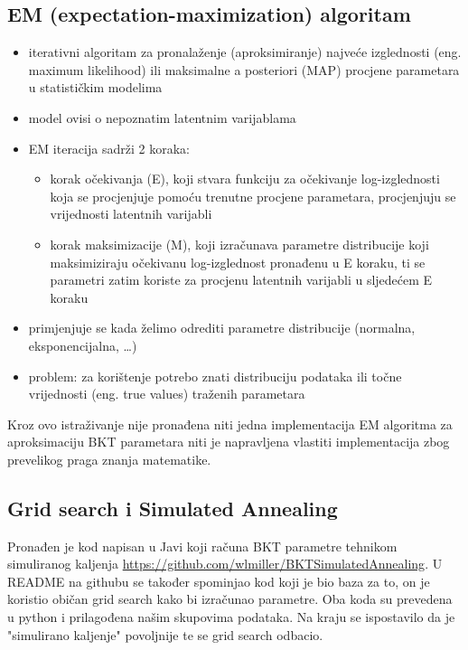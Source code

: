 \documentclass[times, utf8,projekt]{fer}
\begin{document}
\subsection{EM (expectation-maximization) algoritam}
\begin{itemize}
	\item iterativni algoritam za pronalaženje (aproksimiranje) najveće izglednosti (eng. maximum likelihood) ili maksimalne a posteriori (MAP) procjene parametara u statističkim modelima
	\item model ovisi o nepoznatim latentnim varijablama
	\item EM iteracija sadrži 2 koraka:
	\begin{itemize}
		\item 	korak očekivanja (E), koji stvara funkciju za očekivanje log-izglednosti koja se procjenjuje pomoću trenutne procjene parametara, procjenjuju se vrijednosti latentnih varijabli
		\item 	korak maksimizacije (M), koji izračunava parametre distribucije koji maksimiziraju očekivanu log-izglednost pronađenu u E koraku, ti se parametri zatim koriste za procjenu latentnih varijabli u sljedećem E koraku
	\end{itemize}
	
	\item primjenjuje se kada želimo odrediti parametre distribucije (normalna, eksponencijalna, …)
	\item problem: za korištenje potrebo znati distribuciju podataka ili točne vrijednosti (eng. true values) traženih parametara
	
\end{itemize}
Kroz ovo istraživanje nije pronađena niti jedna implementacija EM algoritma za aproksimaciju BKT parametara niti je napravljena vlastiti implementacija zbog prevelikog praga znanja matematike.

\subsection{Grid search i Simulated Annealing}
Pronađen je kod napisan u Javi koji računa BKT parametre tehnikom simuliranog kaljenja \url{https://github.com/wlmiller/BKTSimulatedAnnealing}. U README na githubu se također spominjao kod koji je bio baza za to, on je koristio običan grid search kako bi izračunao parametre. Oba koda su prevedena u python i prilagođena našim skupovima podataka. Na kraju se ispostavilo da je "simulirano kaljenje" povoljnije te se grid search odbacio.
\end{document}
